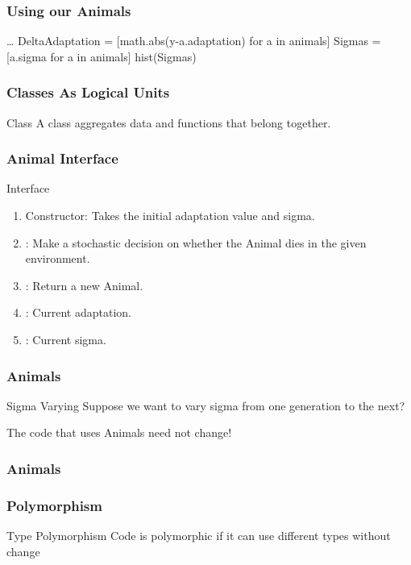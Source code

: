 \begin{frame}[fragile] 
\frametitle{Using our Animals}

\begin{python}
\ldots
DeltaAdaptation = [math.abs(y-a.adaptation) 
                    for a in animals]
Sigmas = [a.sigma for a in animals]
hist(Sigmas)
\end{python}

\end{frame}

\begin{frame}[fragile] 
\frametitle{Classes As Logical Units}
\begin{block}{Class}
A class aggregates data and functions that belong together.
\end{block}
\end{frame}

\begin{frame}[fragile] 
\frametitle{Animal Interface}

\begin{block}{Interface}
\begin{enumerate}
\item Constructor: Takes the initial adaptation value and sigma.
\item {}: Make a stochastic decision on whether the Animal dies in the given environment.
\item {}: Return a new Animal.
\item {}: Current adaptation.
\item {}: Current sigma.
\end{enumerate}
\end{block}
\end{frame}

\begin{frame}[fragile] 
\frametitle{Animals}
\begin{block}{Sigma Varying}
Suppose we want to vary sigma from one generation to the next?
\end{block}

The \alert{code that uses Animals} need not change!
\end{frame}
\begin{frame}[fragile] 
\frametitle{Animals}

\end{frame}

\begin{frame}[fragile] 
\frametitle{Polymorphism}

\begin{block}{Type Polymorphism}
Code is \alert{polymorphic} if it can use different types without change
\end{block}
\end{frame}

